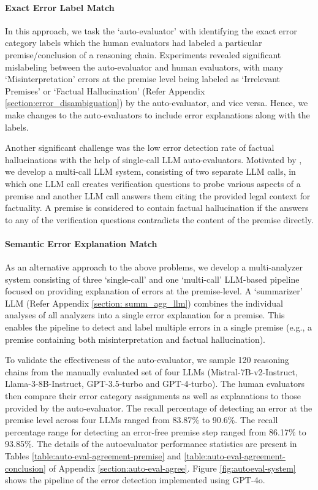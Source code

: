 \paragraph{Exact Error Label Match} In this approach, we task the `auto-evaluator' with identifying the exact error category labels which the human evaluators had labeled a particular premise/conclusion of a reasoning chain. Experiments revealed significant mislabeling between the auto-evaluator and human evaluators, with many `Misinterpretation' errors at the premise level being labeled as `Irrelevant Premises' or `Factual Hallucination' (Refer Appendix \ref{section:error_disambiguation}) by the auto-evaluator, and vice versa. Hence, we make changes to the auto-evaluators to include error explanations along with the labels.

Another significant challenge was the low error detection rate of factual hallucinations with the help of single-call LLM auto-evaluators. Motivated by \citet{varshney2023stitchtimesavesnine, dhuliawala2023chainofverificationreduceshallucinationlarge}, we develop a multi-call LLM system, consisting of two separate LLM calls,  in which one LLM call creates verification questions to probe various aspects of a premise and another LLM call answers them citing the provided legal context for factuality. A premise is considered to contain factual hallucination if the answers to any of the verification questions contradicts the content of the premise directly.  

\paragraph{Semantic Error Explanation Match} As an alternative approach to the above problems, we develop a multi-analyzer system consisting of three `single-call' and one `multi-call' LLM-based pipeline focused on providing explanation of errors at the premise-level. A `summarizer' LLM (Refer Appendix \ref{section: summ_agg_llm}) combines the individual analyses of all analyzers into a single error explanation for a premise. This enables the pipeline to detect and label multiple errors in a single premise (e.g., a premise containing both misinterpretation and factual hallucination).

To validate the effectiveness of the auto-evaluator, we sample 120 reasoning chains from the manually evaluated set of four LLMs (Mistral-7B-v2-Instruct, Llama-3-8B-Instruct, GPT-3.5-turbo and GPT-4-turbo). The human evaluators then compare their error category assignments as well as explanations to those provided by the auto-evaluator. The recall percentage of detecting an error at the premise level across four LLMs ranged from 83.87$\%$ to 90.6\%. The recall percentage range for detecting an error-free premise step ranged from 86.17$\%$ to 93.85$\%$. The details of the autoevaluator performance statistics are present in Tables \ref{table:auto-eval-agreement-premise} and \ref{table:auto-eval-agreement-conclusion} of Appendix \ref{section:auto-eval-agree}. Figure \ref{fig:autoeval-system} shows the pipeline of the error detection implemented using GPT-4o. 

